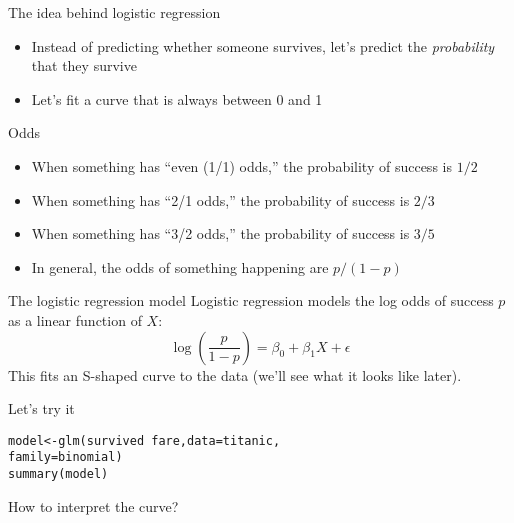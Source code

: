 \documentclass{beamer}\usepackage[]{graphicx}\usepackage[]{color}
\makeatletter
\newcommand{\hlopt}[1]{\textcolor[rgb]{1,0.894,0.769}{#1}}%
\newcommand{\hlstd}[1]{\textcolor[rgb]{1,0.894,0.769}{#1}}%
\newcommand{\hlkwb}[1]{\textcolor[rgb]{0.804,0.776,0.451}{#1}}%
\newcommand{\hlkwc}[1]{\textcolor[rgb]{0.78,0.941,0.545}{#1}}%
\newcommand{\hlkwd}[1]{\textcolor[rgb]{1,0.78,0.769}{#1}}%
\newenvironment{kframe}{%
 \def\at@end@of@kframe{}%
 \ifinner\ifhmode%
  \def\at@end@of@kframe{\end{minipage}}%
  \begin{minipage}{\columnwidth}%
 \fi\fi%
 \def\FrameCommand##1{\hskip\@totalleftmargin \hskip-\fboxsep
 \colorbox{shadecolor}{##1}\hskip-\fboxsep
     \hskip-\linewidth \hskip-\@totalleftmargin \hskip\columnwidth}%
 \MakeFramed {\advance\hsize-\width
   \@totalleftmargin\z@ \linewidth\hsize
   \@setminipage}}%
 {\par\unskip\endMakeFramed%
 \at@end@of@kframe}
\newenvironment{knitrout}{}{} %
\makeatother
\begin{document}
\begin{darkframes}
    \begin{frame}{The idea behind logistic regression}
      \begin{itemize}
        \item Instead of predicting whether someone survives, let's predict the \emph{probability} that they survive
        \item Let's fit a curve that is always between 0 and 1
      \end{itemize}
    \end{frame}

    \begin{frame}{Odds}
      \begin{itemize}
        \item When something has ``even (1/1) odds,'' the probability of success is $1/2$
        \item When something has ``2/1 odds,'' the probability of success is $2/3$
        \item When something has ``3/2 odds,'' the probability of success is $3/5$
        \item In general, the odds of something happening are $p/(1-p)$
      \end{itemize}
      \lc
    \end{frame}

    \begin{frame}{The logistic regression model}
      Logistic regression models the \alert{log odds} of success $p$ as a linear function of $X$:
      \[
        \log\left(\frac{p}{1-p}\right) = \beta_0 + \beta_1 X + \epsilon
      \]
      This fits an S-shaped curve to the data (we'll see what it looks like later).
    \end{frame}

    \begin{frame}[fragile]{Let's try it}
\begin{knitrout}
\begin{kframe}
\begin{alltt}
\hlstd{model} \hlkwb{<-} \hlkwd{glm}\hlstd{(survived} \hlopt{~} \hlstd{fare,} \hlkwc{data}\hlstd{=titanic,}
             \hlkwc{family}\hlstd{=binomial)}
\hlkwd{summary}\hlstd{(model)}
\end{alltt}
\end{kframe}
\end{knitrout}
    \end{frame}

    \begin{frame}{How to interpret the curve?}
      

\end{frame}
\end{darkframes}
\end{document}
